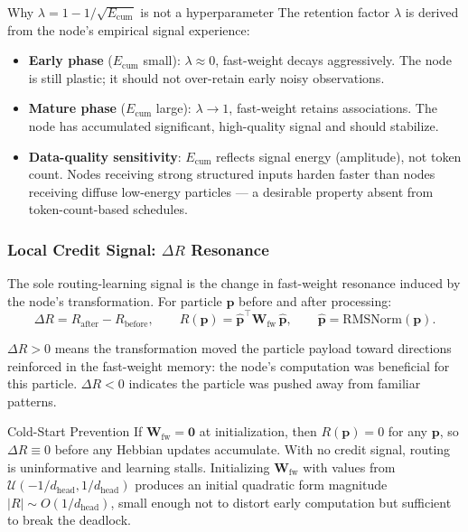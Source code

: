 \documentclass[11pt,a4paper]{article}
\theoremstyle{definition}
\newcommand{\vp}{\mathbf{p}}
\newcommand{\mW}{\mathbf{W}}
\newcommand{\RMSNorm}{\mathrm{RMSNorm}}
\begin{document}
\begin{designbox}{Why $\lambda = 1 - 1/\sqrt{E_\text{cum}}$ is not a hyperparameter}
  The retention factor $\lambda$ is derived from the node's empirical signal experience:
  \begin{itemize}[itemsep=0pt]
    \item \textbf{Early phase} ($E_\text{cum}$ small): $\lambda \approx 0$, fast-weight decays aggressively.
      The node is still plastic; it should not over-retain early noisy observations.
    \item \textbf{Mature phase} ($E_\text{cum}$ large): $\lambda \to 1$, fast-weight retains associations.
      The node has accumulated significant, high-quality signal and should stabilize.
    \item \textbf{Data-quality sensitivity}: $E_\text{cum}$ reflects signal energy (amplitude),
      not token count. Nodes receiving strong structured inputs harden faster than nodes
      receiving diffuse low-energy particles --- a desirable property absent from token-count-based schedules.
  \end{itemize}
\end{designbox}

\subsubsection{Local Credit Signal: $\Delta R$ Resonance}
\label{sec:credit}

The sole routing-learning signal is the change in fast-weight resonance induced by the node's
transformation.
For particle $\vp$ before and after processing:
\begin{equation}
  \Delta R = R_\text{after} - R_\text{before},
  \qquad
  R(\vp) = \hat{\vp}^\top \mW_\text{fw}\, \hat{\vp},
  \qquad \hat{\vp} = \RMSNorm(\vp).
  \label{eq:credit}
\end{equation}

$\Delta R > 0$ means the transformation moved the particle payload toward directions reinforced
in the fast-weight memory: the node's computation was beneficial for this particle.
$\Delta R < 0$ indicates the particle was pushed away from familiar patterns.

\begin{mathbox}{Cold-Start Prevention}
  If $\mW_\text{fw} = \mathbf{0}$ at initialization, then $R(\vp) = 0$ for any $\vp$,
  so $\Delta R \equiv 0$ before any Hebbian updates accumulate.
  With no credit signal, routing is uninformative and learning stalls.
  Initializing $\mW_\text{fw}$ with values from $\mathcal{U}(-1/d_\text{head}, 1/d_\text{head})$
  produces an initial quadratic form magnitude $|R| \sim O(1/d_\text{head})$,
  small enough not to distort early computation but sufficient to break the deadlock.
\end{mathbox}
\end{document}

